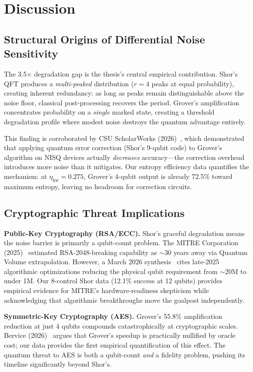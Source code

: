 \documentclass[conference]{IEEEtran}
\begin{document}
\section{Discussion}

\subsection{Structural Origins of Differential Noise Sensitivity}

The 3.5$\times$ degradation gap is the thesis's central empirical contribution. Shor's QFT produces a \emph{multi-peaked} distribution ($r = 4$ peaks at equal probability), creating inherent redundancy: as long as peaks remain distinguishable above the noise floor, classical post-processing recovers the period. Grover's amplification concentrates probability on a \emph{single} marked state, creating a threshold degradation profile where modest noise destroys the quantum advantage entirely.

This finding is corroborated by CSU ScholarWorks (2026)~\cite{b7}, which demonstrated that applying quantum error correction (Shor's 9-qubit code) to Grover's algorithm on NISQ devices actually \emph{decreases} accuracy---the correction overhead introduces more noise than it mitigates. Our entropy efficiency data quantifies the mechanism: at $\eta_{\text{hw}} = 0.275$, Grover's 4-qubit output is already 72.5\% toward maximum entropy, leaving no headroom for correction circuits.

\subsection{Cryptographic Threat Implications}

\textbf{Public-Key Cryptography (RSA/ECC).} Shor's graceful degradation means the noise barrier is primarily a qubit-count problem. The MITRE Corporation (2025)~\cite{b8} estimated RSA-2048-breaking capability as $\sim$30 years away via Quantum Volume extrapolation. However, a March 2026 synthesis~\cite{b9} cites late-2025 algorithmic optimizations reducing the physical qubit requirement from $\sim$20M to under 1M. Our 8-control Shor data (12.1\% success at 12 qubits) provides empirical evidence for MITRE's hardware-readiness skepticism while acknowledging that algorithmic breakthroughs move the goalpost independently.

\textbf{Symmetric-Key Cryptography (AES).} Grover's 55.8\% amplification reduction at just 4 qubits compounds catastrophically at cryptographic scales. Bervice (2026)~\cite{b10} argues that Grover's speedup is practically nullified by oracle cost; our data provides the first empirical quantification of this effect. The quantum threat to AES is both a qubit-count \emph{and} a fidelity problem, pushing its timeline significantly beyond Shor's.
\end{document}
